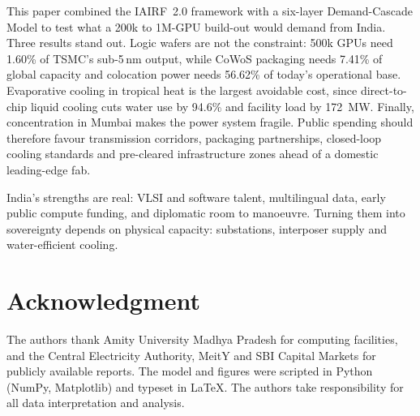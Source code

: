 \documentclass[conference]{IEEEtran}
\begin{document}
This paper combined the IAIRF~2.0 framework with a six-layer Demand-Cascade Model to test what a 200k to 1M-GPU build-out would demand from India. Three results stand out. Logic wafers are not the constraint: 500k GPUs need 1.60\% of TSMC's sub-5\,nm output, while CoWoS packaging needs 7.41\% of global capacity and colocation power needs 56.62\% of today's operational base. Evaporative cooling in tropical heat is the largest avoidable cost, since direct-to-chip liquid cooling cuts water use by 94.6\% and facility load by 172~MW. Finally, concentration in Mumbai makes the power system fragile. Public spending should therefore favour transmission corridors, packaging partnerships, closed-loop cooling standards and pre-cleared infrastructure zones ahead of a domestic leading-edge fab.

India's strengths are real: VLSI and software talent, multilingual data, early public compute funding, and diplomatic room to manoeuvre. Turning them into sovereignty depends on physical capacity: substations, interposer supply and water-efficient cooling.

\section*{Acknowledgment}
The authors thank Amity University Madhya Pradesh for computing facilities, and the Central Electricity Authority, MeitY and SBI Capital Markets for publicly available reports. The model and figures were scripted in Python (NumPy, Matplotlib) and typeset in \LaTeX. The authors take responsibility for all data interpretation and analysis.

\balance



\end{document}
